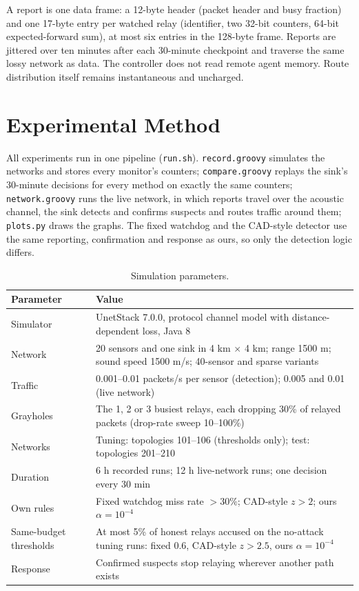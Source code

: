 \documentclass{article}
\begin{document}
A report is one data frame: a 12-byte header (packet header and busy fraction) and one 17-byte entry per watched relay (identifier, two 32-bit counters, 64-bit expected-forward sum), at most six entries in the 128-byte frame. Reports are jittered over ten minutes after each 30-minute checkpoint and traverse the same lossy network as data. The controller does not read remote agent memory. Route distribution itself remains instantaneous and uncharged.

\section{Experimental Method}\label{sec:experiments}
All experiments run in one pipeline (\texttt{run.sh}). \texttt{record.groovy} simulates the networks and stores every monitor's counters; \texttt{compare.groovy} replays the sink's 30-minute decisions for every method on exactly the same counters; \texttt{network.groovy} runs the live network, in which reports travel over the acoustic channel, the sink detects and confirms suspects and routes traffic around them; \texttt{plots.py} draws the graphs. The fixed watchdog and the CAD-style detector use the same reporting, confirmation and response as ours, so only the detection logic differs.

\begin{table}[H]\centering\small{}
\begin{tabular}{p{4.6cm}p{9.2cm}}\toprule Parameter & Value\\\midrule
Simulator & UnetStack 7.0.0, protocol channel model with distance-dependent loss, Java 8\\
Network & 20 sensors and one sink in 4 km $\times$ 4 km; range 1500 m; sound speed 1500 m/s; 40-sensor and sparse variants\\
Traffic & 0.001--0.01 packets/s per sensor (detection); 0.005 and 0.01 (live network)\\
Grayholes & The 1, 2 or 3 busiest relays, each dropping 30\% of relayed packets (drop-rate sweep 10--100\%)\\
Networks & Tuning: topologies 101--106 (thresholds only); test: topologies 201--210\\
Duration & 6 h recorded runs; 12 h live-network runs; one decision every 30 min\\
Own rules & Fixed watchdog miss rate $>30\%$; CAD-style $z>2$; ours $\alpha=10^{-4}$\\
Same-budget thresholds & At most 5\% of honest relays accused on the no-attack tuning runs: fixed 0.6, CAD-style $z>2.5$, ours $\alpha=10^{-4}$\\
Response & Confirmed suspects stop relaying wherever another path exists\\\bottomrule
\end{tabular}
\caption{Simulation parameters.}\label{tab:params}
\end{table}
\end{document}
